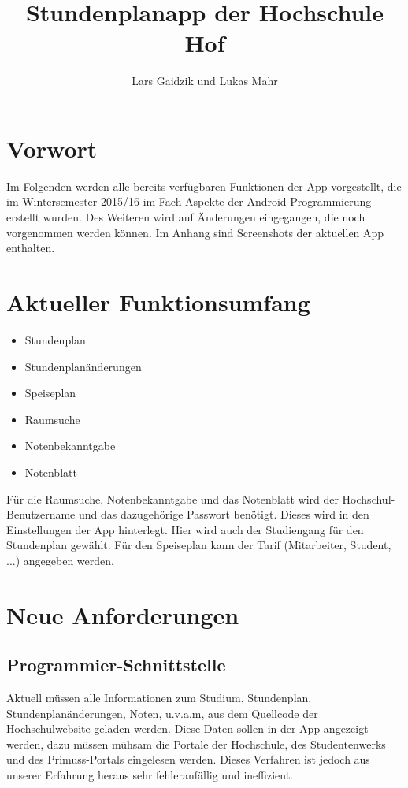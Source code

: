 \documentclass{article}
\begin{document}
\begin{titlepage}
	\author{Lars Gaidzik und Lukas Mahr} 
	\title{Stundenplanapp der Hochschule Hof}
	\date{} 
	\maketitle
\end{titlepage}
\tableofcontents
\newpage
\section{Vorwort}
Im Folgenden werden alle bereits verfügbaren Funktionen der App vorgestellt, die im Wintersemester 2015/16 im Fach Aspekte der Android-Programmierung erstellt wurden. 
Des Weiteren wird auf Änderungen eingegangen, die noch vorgenommen werden können. Im Anhang sind Screenshots der aktuellen App enthalten.
\section{Aktueller Funktionsumfang}
\begin{itemize}
\item Stundenplan

\item Stundenplanänderungen

\item Speiseplan

\item Raumsuche

\item Notenbekanntgabe

\item Notenblatt
\end{itemize}
Für die Raumsuche, Notenbekanntgabe und das Notenblatt wird der Hochschul-Benutzername und das dazugehörige Passwort benötigt. 
Dieses wird in den Einstellungen der App hinterlegt. Hier wird auch der Studiengang für den Stundenplan gewählt. 
Für den Speiseplan kann der Tarif (Mitarbeiter, Student, ...) angegeben werden.

\section{Neue Anforderungen}
\subsection{Programmier-Schnittstelle}
\label{schnittstelle}

Aktuell müssen alle Informationen zum Studium, Stundenplan, Stundenplanänderungen, Noten, u.v.a.m, aus dem Quellcode der Hochschulwebsite geladen werden.
Diese Daten sollen in der App angezeigt werden, dazu müssen mühsam die Portale der Hochschule, des Studentenwerks und des Primuss-Portals eingelesen werden. 
Dieses Verfahren ist jedoch aus unserer Erfahrung heraus sehr fehleranfällig und ineffizient. 
\end{document}
